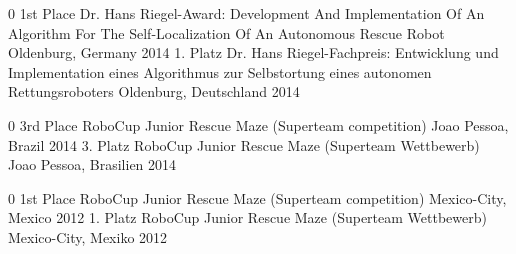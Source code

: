 \begin{cvhonors}
\multilang
  {0}
  {\cvhonor
    {1st Place} %
    {Dr. Hans Riegel-Award: Development And Implementation Of An Algorithm For The Self-Localization Of An Autonomous Rescue Robot} %
    {Oldenburg, Germany} %
    {2014} %
  }{\cvhonor
    {1. Platz}
    {Dr. Hans Riegel-Fachpreis: Entwicklung und Implementation eines Algorithmus zur Selbstortung eines autonomen Rettungsroboters}
    {Oldenburg, Deutschland}
    {2014}
  }

\multilang
  {0}
  {\cvhonor
    {3rd Place} %
    {RoboCup Junior Rescue Maze (Superteam competition)} %
    {Joao Pessoa, Brazil} %
    {2014} %
  }{\cvhonor
    {3. Platz}
    {RoboCup Junior Rescue Maze (Superteam Wettbewerb)}
    {Joao Pessoa, Brasilien}
    {2014} 
  }

\multilang
  {0}
  {\cvhonor
    {1st Place} %
    {RoboCup Junior Rescue Maze (Superteam competition)} %
    {Mexico-City, Mexico} %
    {2012} %
  }{\cvhonor
    {1. Platz}
    {RoboCup Junior Rescue Maze (Superteam Wettbewerb)}
    {Mexico-City, Mexiko}
    {2012}
  }
\end{cvhonors}
